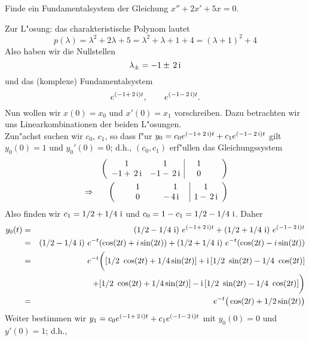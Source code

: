 \begin{bspX}
Finde ein Fundamentalsystem der Gleichung $ x''+ 2x'+5x=0.$

Zur L"osung: das charakteristische Polynom lautet
$$p(\lambda) 
= \lambda^2 + 2 \lambda  + 5
= \lambda^2 + \lambda +1 +4
= (\lambda + 1)^2 + 4 
$$
Also haben wir die Nullstellen
$$\lambda_\pm = - 1\pm \, 2 \,{\rm i}$$
und das (komplexe) Fundamentalsystem
$$ 
e^{(- 1 + \, 2 \,{\rm i})t},\qquad 
e^{(- 1 - \, 2 \,{\rm i})t}.
$$
Nun wollen wir $x(0)=x_0$ und $x'(0)=x_1$ vorschreiben. Dazu betrachten wir uns 
Linearkombinationen der beiden L"osungen.\\
Zun"achst suchen wir $c_0$, $c_1$, so dass f"ur 
$y_0=c_0 e^{(- 1 + \, 2 \,{\rm i})t} + c_1 e^{(- 1 - \, 2 \,{\rm i})t}$ gilt $y_0(0)=1$ und $y_0'(0)=0$; d.h.,
$(c_0, c_1)$ erf"ullen das Gleichungssystem
\begin{eqnarray*}
&&\left(\begin{array}{cc|c} 
1 & 1 & \quad 1\qquad\\
-1+\,2\,{\rm i} & -1-\,2\,{\rm i}  &\quad 0\qquad\\
\end{array}\right)\\
&\Rightarrow&
\left(\begin{array}{cc|c} 
\qquad 1 \quad & \qquad 1\quad & 1\\
\qquad 0 \quad & -\,4\,{\rm i}  & 1-\,2\,{\rm i}  \\
\end{array}\right)\\
\end{eqnarray*}
Also finden wir $c_1 = 1/2+1/4\,\,{\rm i}$ und $c_0 = 1-c_1 = 1/2-1/4\,\,{\rm i}$. Daher
\begin{eqnarray*}
y_0(t) 
& = & 
(1/2-1/4\,\,{\rm i})\,\,e^{(- 1 + \, 2 \,{\rm i})t} + 
(1/2+1/4\,\,{\rm i})\,\,e^{(- 1 - \, 2 \,{\rm i})t} \\
& = & 
(1/2-1/4\,\,{\rm i})\,\,e^{-t} (\cos(2 t) + i\sin(2t))  + 
(1/2+1/4\,\,{\rm i})\,\,e^{-t}(\cos(2 t) -  i\sin(2t))\\
& = & e^{-t}\bigg(
[1/2\,\, \cos(2 t)  + 1/4 \sin(2t)] + {\rm i}\,[1/2\,\,\sin(2t)-1/4\,\,\cos(2t)]\\
&& \quad+ [1/2\,\, \cos(2 t)  + 1/4 \sin(2t)] - {\rm i}\,[1/2\,\,\sin(2t)-1/4\,\,\cos(2t)]\bigg)\\
& = & e^{-t}\big( \cos(2 t)  +1/2 \sin(2t)\big)
\end{eqnarray*}
Weiter bestimmen wir 
$y_1=c_0 e^{(- 1 + \, 2 \,{\rm i})t} + c_1 e^{(- 1 - \, 2 \,{\rm i})t}$ mit $y_0(0)=0$ und $y'(0)=1$; d.h.,

\end{bspX}
